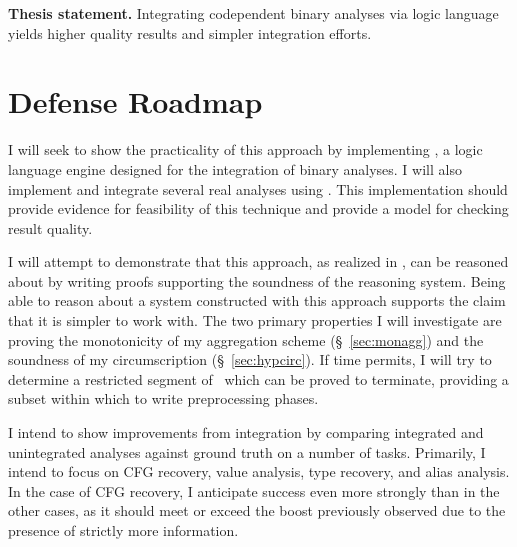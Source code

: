\begin{inset}
{\bf Thesis statement.}
Integrating codependent binary analyses via logic language yields higher quality results and simpler integration efforts.
\end{inset}

\section{Defense Roadmap}
I will seek to show the practicality of this approach by implementing \sysname, a logic language engine designed for the integration of binary analyses.
I will also implement and integrate several real analyses using \sysname.
This implementation should provide evidence for feasibility of this technique and provide a model for checking result quality.

I will attempt to demonstrate that this approach, as realized in \sysname, can be reasoned about by writing proofs supporting the soundness of the reasoning system.
Being able to reason about a system constructed with this approach supports the claim that it is simpler to work with.
The two primary properties I will investigate are proving the monotonicity of my aggregation scheme (\S~\ref{sec:monagg}) and the soundness of my circumscription (\S~\ref{sec:hypcirc}).
If time permits, I will try to determine a restricted segment of \sysname\ which can be proved to terminate, providing a subset within which to write preprocessing phases.

I intend to show improvements from integration by comparing integrated and unintegrated analyses against ground truth on a number of tasks.
Primarily, I intend to focus on CFG recovery, value analysis, type recovery, and alias analysis.
In the case of CFG recovery, I anticipate success even more strongly than in the other cases, as it should meet or exceed the boost previously observed\cite{jakstab} due to the presence of strictly more information.

